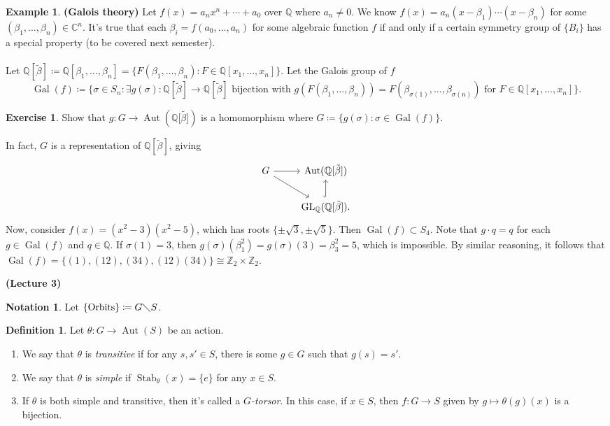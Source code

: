 \documentclass[10pt,letterpaper,cm]{nupset}
\theoremstyle{definition}
\newtheorem*{definition}{Definition}
\newtheorem{exmp}{Example}
\newtheorem*{notation}{Notation}
\newtheorem{exercise}{Exercise}
\newcommand{\C}{\mathbb C}
\newcommand{\Q}{\mathbb Q}
\newcommand{\Z}{\mathbb Z}
\newcommand{\1}{\mathbf{1}}
\newcommand{\0}{\vec 0}
\DeclareMathOperator*{\GL}{GL}
\DeclareMathOperator{\gal}{Gal}
\DeclareMathOperator{\aut}{Aut}
\DeclareMathOperator{\stab}{Stab}
\begin{document}
\begin{exmp}{\textbf{(Galois theory)}}
Let $f(x) = a_nx^n + \cdots + a_0$ over $\Q$ where $a_n \ne 0$. We know $f(x) = a_n(x-\beta_1)\cdots (x-\beta_n)$ for some $(\beta_1, \ldots, \beta_n) \in \C^n$. It's true that each $\beta_i = f(a_0, \ldots, a_n)$ for some algebraic function $f$  if and only if a certain symmetry group of $\{B_i\}$ has a special property (to be covered next semester).
\\ \\ Let $\Q[\tilde{\beta}]\coloneqq  \Q[\beta_1, \ldots, \beta_n] = \{F(\beta_1, \ldots, \beta_n) : F \in \Q[x_1, \ldots, x_n]\}$. Let the Galois group of $f$ $$\gal(f)\coloneqq  \{\sigma \in S_n : \exists g(\sigma) : \Q[\tilde{\beta}] \to \Q[\tilde{\beta}] \text{ bijection with } g(F(\beta_1, \ldots, \beta_n)) = F(\beta_{\sigma(1)}, \ldots, \beta_{\sigma(n)}) \text{ for } F \in \Q[x_1, \ldots, x_n]\}.$$

\begin{exercise}
Show that $g: G \to \aut(\Q[\tilde{\beta]})$ is a homomorphism where $G \coloneqq  \{g(\sigma): \sigma \in \gal(f)\}$.
\end{exercise}
In fact, $G$ is a representation of $\Q[\tilde{\beta}]$, giving
\[ \begin{tikzcd}
G \arrow{r} \arrow[swap]{dr} & \aut(\Q[\tilde{\beta}]) \\%
 & \GL_\Q(\Q[\tilde{\beta}]) \arrow[hookrightarrow]{u}.
\end{tikzcd}
\]
Now, consider $f(x) = (x^2 -3)(x^2 -5)$, which has roots $\{\pm \sqrt{3}, \pm \sqrt{5}\}$. Then $\gal(f) \subset S_4$. Note that $g\cdot q= q$ for each $g \in \gal(f)$ and $q\in \Q$. If $\sigma(1) =3$, then $g(\sigma)(\beta_1^2) = g(\sigma)  (3) = \beta_3^2 = 5$, which is impossible. By similar reasoning, it follows that $\gal(f) = \{(1), (1 2), (3 4), (1 2)(3 4)\} \cong \Z_2 \times \Z_2$.
\end{exmp}

\begin{center}
{\textbf{(Lecture 3)}}
\end{center}

\begin{notation}
Let $\{\text{Orbits}\} \coloneqq  G \diagdown S$.
\end{notation}

\begin{definition} Let $\theta: G \to \aut(S)$ be an action.
\begin{enumerate}
\item We say that  $\theta$ is \textit{transitive} if for any $s, s' \in S$, there is some $g \in G$ such that $g(s) = s'$. 
\item We say that $\theta$ is \textit{simple} if $\stab_\theta(x) = \{e\}$ for any $x \in S$.
\item If $\theta$ is both simple and transitive, then it's called a \textit{$G$-torsor}. In this case, if $x \in S$, then $f: G \to S$ given by $g\mapsto \theta(g)(x)$ is a bijection.
\end{enumerate}
\end{definition}
\end{document}
